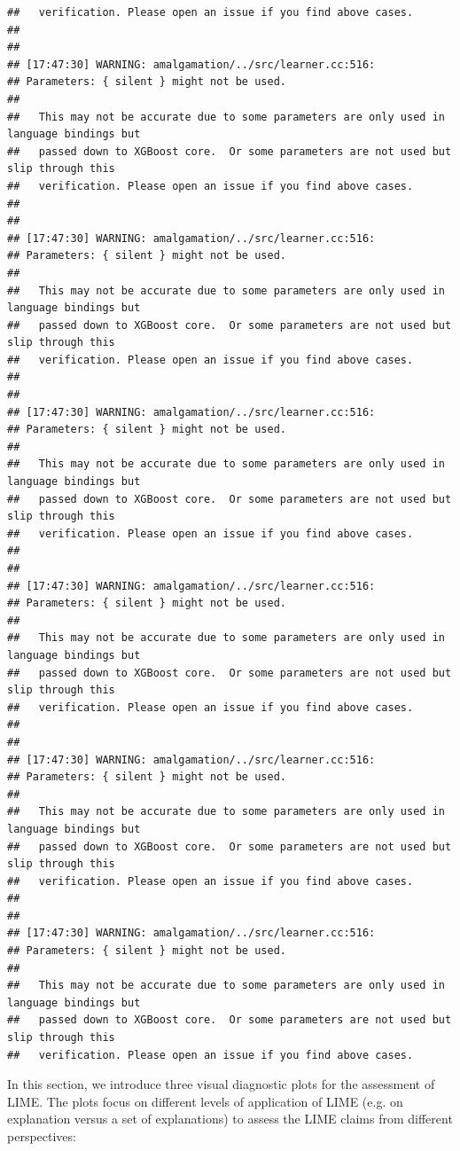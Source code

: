 \documentclass[AMS,STIX2COL]{WileyNJD-v2}\usepackage[]{graphicx}\usepackage[]{color}
\makeatletter
\newenvironment{kframe}{%
 \def\at@end@of@kframe{}%
 \ifinner\ifhmode%
  \def\at@end@of@kframe{\end{minipage}}%
  \begin{minipage}{\columnwidth}%
 \fi\fi%
 \def\FrameCommand##1{\hskip\@totalleftmargin \hskip-\fboxsep
 \colorbox{shadecolor}{##1}\hskip-\fboxsep
     \hskip-\linewidth \hskip-\@totalleftmargin \hskip\columnwidth}%
 \MakeFramed {\advance\hsize-\width
   \@totalleftmargin\z@ \linewidth\hsize
   \@setminipage}}%
 {\par\unskip\endMakeFramed%
 \at@end@of@kframe}
\newenvironment{knitrout}{}{} %
\makeatother
\begin{document}
\begin{knitrout}
\begin{kframe}
\begin{verbatim}
##   verification. Please open an issue if you find above cases.
## 
## 
## [17:47:30] WARNING: amalgamation/../src/learner.cc:516: 
## Parameters: { silent } might not be used.
## 
##   This may not be accurate due to some parameters are only used in language bindings but
##   passed down to XGBoost core.  Or some parameters are not used but slip through this
##   verification. Please open an issue if you find above cases.
## 
## 
## [17:47:30] WARNING: amalgamation/../src/learner.cc:516: 
## Parameters: { silent } might not be used.
## 
##   This may not be accurate due to some parameters are only used in language bindings but
##   passed down to XGBoost core.  Or some parameters are not used but slip through this
##   verification. Please open an issue if you find above cases.
## 
## 
## [17:47:30] WARNING: amalgamation/../src/learner.cc:516: 
## Parameters: { silent } might not be used.
## 
##   This may not be accurate due to some parameters are only used in language bindings but
##   passed down to XGBoost core.  Or some parameters are not used but slip through this
##   verification. Please open an issue if you find above cases.
## 
## 
## [17:47:30] WARNING: amalgamation/../src/learner.cc:516: 
## Parameters: { silent } might not be used.
## 
##   This may not be accurate due to some parameters are only used in language bindings but
##   passed down to XGBoost core.  Or some parameters are not used but slip through this
##   verification. Please open an issue if you find above cases.
## 
## 
## [17:47:30] WARNING: amalgamation/../src/learner.cc:516: 
## Parameters: { silent } might not be used.
## 
##   This may not be accurate due to some parameters are only used in language bindings but
##   passed down to XGBoost core.  Or some parameters are not used but slip through this
##   verification. Please open an issue if you find above cases.
## 
## 
## [17:47:30] WARNING: amalgamation/../src/learner.cc:516: 
## Parameters: { silent } might not be used.
## 
##   This may not be accurate due to some parameters are only used in language bindings but
##   passed down to XGBoost core.  Or some parameters are not used but slip through this
##   verification. Please open an issue if you find above cases.
\end{verbatim}
\end{kframe}
\end{knitrout}



In this section, we introduce three visual diagnostic plots for the assessment of LIME. The plots focus on different levels of application of LIME (e.g. on explanation versus a set of explanations) to assess the LIME claims from different perspectives:
\end{document}
